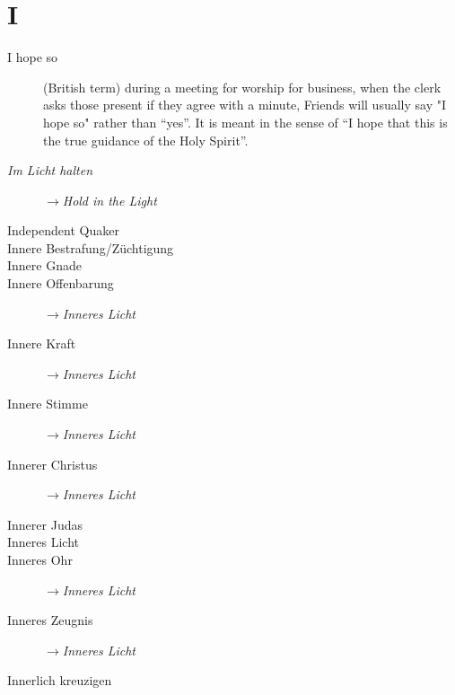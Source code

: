 \section*{I}

\articlesize

\begin{description}

\item[I hope so]
    (British term) during a meeting for worship for business, when the clerk asks those present if they agree with a minute, Friends will usually say "I hope so" rather than "`yes"'. It is meant in the sense of "`I hope that this is the true guidance of the Holy Spirit"'.

 \item[\textit{Im Licht halten}] $\to$\textit{Hold in the Light}

\item[Independent Quaker]

 \item[Innere Bestrafung/Züchtigung]
 \item[Innere Gnade]
 \item[Innere Offenbarung] $\to$\textit{Inneres Licht}
 \item[Innere Kraft] $\to$\textit{Inneres Licht}
 \item[Innere Stimme] $\to$\textit{Inneres Licht}
 \item[Innerer Christus] $\to$\textit{Inneres Licht}
 \item[Innerer Judas]
 \item[Inneres Licht]
 \item[Inneres Ohr] $\to$\textit{Inneres Licht}
 \item[Inneres Zeugnis] $\to$\textit{Inneres Licht}
 \item[Innerlich kreuzigen]
 \end{description}

\normalsize